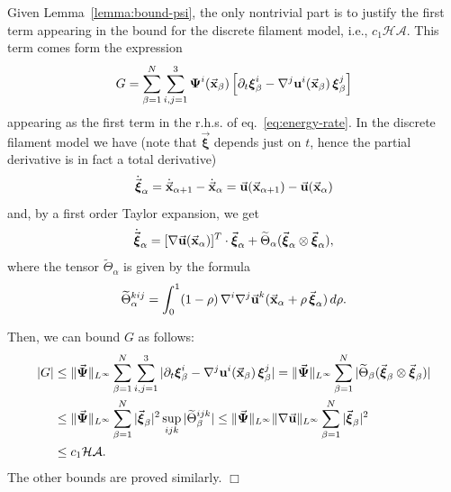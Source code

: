 \documentclass[a4paper,11pt]{article}
\numberwithin{equation}{section}
\newenvironment{proof}[1][Proof]{{\sc #1.} }{\hfill $\Box$}
\newcommand{\U}{\mbox{$\vec{\bf u}$}}
\newcommand{\UU}{\mbox{${\bf u}$}}
\newcommand{\vPsi}{\mbox{$\vec{\boldsymbol \Psi}$}}
\newcommand{\x}{\mbox{$\vec{\bf x}$}}
\newcommand{\bxi}{\mbox{$\vec{\boldsymbol \xi}$}}
\newcommand{\bbxi}{\mbox{${\boldsymbol \xi}$}}
\begin{document}
\begin{proof}
Given Lemma~\ref{lemma:bound-psi}, the only nontrivial part is to
justify the first term appearing in the bound for the discrete
filament model, i.e., $c_1 \mathcal{H} \mathcal{A}$. This term comes
form the expression  
$$
G =  \sum_{\beta=1}^N\sum_{i,j=1}^3\boldsymbol{\Psi}^i(\x_\beta)
\left[ {\partial_t \bbxi}_\beta^i - 
\nabla^j \UU^i(\x_\beta)\,\bbxi_\beta^j\right]
$$
appearing as the first term in the r.h.s. of
eq.~\eqref{eq:energy-rate}. In the discrete filament model we have
(note that $\bxi$ depends just on $t$, hence the partial derivative
is in fact a total derivative) 
\begin{equation*}
\dot{\bxi}_\alpha =
{\dot{\x}}_{\alpha+1}-{\dot{\x}}_\alpha=\U(\x_{\alpha+1})-\U(\x_\alpha)   
\end{equation*}
and, by a first order Taylor expansion, we get
\begin{equation*}
\dot{\bxi}_\alpha =   [\nabla \U(\x_\alpha)]^T \cdot \bxi_\alpha +
 \widetilde \Theta_\alpha (\bxi_\alpha \otimes
\bxi_\alpha), 
\end{equation*}
where the tensor $\widetilde \Theta_\alpha$ is given by the formula
\begin{equation*}
 \widetilde \Theta_\alpha^{kij} = \int_0^1 (1-\rho) \,
\nabla^i \nabla^j \U^k(\x_\alpha+\rho\, \bxi_\alpha)\,d\rho . 
\end{equation*}

Then, we can bound $G$ as follows:
\begin{equation*}
  \begin{split}
|G| & \le \|\vPsi\|_{L^\infty}\sum_{\beta=1}^N \sum_{i,j=1}^3| {\partial_t
  \bbxi}_\beta^i-\nabla^j \UU^i(\x_\beta)\,\bbxi_\beta^j | 
= \|\vPsi\|_{L^\infty}  \sum_{\beta=1}^N |
 \widetilde \Theta_\beta (\bxi_\beta \otimes
\bxi_\beta) 
|
\\ & \le  \|\vPsi\|_{L^\infty}  \sum_{\beta=1}^N |\bxi_\beta|^2
 \sup_{ijk}|\widetilde \Theta_\beta^{ijk}| 
\le  \|\vPsi\|_{L^\infty}  \|\nabla \U\|_{L^\infty} \sum_{\beta=1}^N
|\bxi_\beta|^2  
\\ & \le c_1 \mathcal{H} \mathcal{A}.
  \end{split}
\end{equation*}
The other bounds  are proved similarly.
\end{proof}
\end{document}
